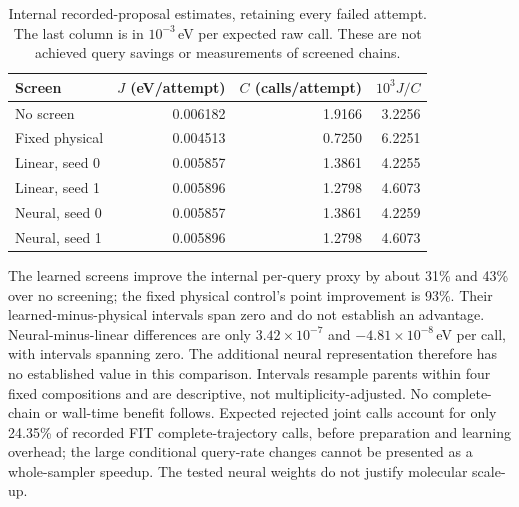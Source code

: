 \begin{table}[h]
\centering\small
\begin{tabular}{lrrr}
\toprule
Screen & $J$ (eV/attempt) & $C$ (calls/attempt) & $10^3 J/C$ \\
\midrule
No screen & 0.006182 & 1.9166 & 3.2256 \\
Fixed physical & 0.004513 & 0.7250 & 6.2251 \\
Linear, seed 0 & 0.005857 & 1.3861 & 4.2255 \\
Linear, seed 1 & 0.005896 & 1.2798 & 4.6073 \\
Neural, seed 0 & 0.005857 & 1.3861 & 4.2259 \\
Neural, seed 1 & 0.005896 & 1.2798 & 4.6073 \\
\bottomrule
\end{tabular}
\caption{Internal recorded-proposal estimates, retaining every failed attempt.
The last column is in $10^{-3}$\,eV per expected raw call. These are not achieved
query savings or measurements of screened chains.}
\label{tab:delayed-screen}
\end{table}

The learned screens improve the internal per-query proxy by about 31\% and
43\% over no screening; the fixed physical control's point improvement is 93\%.
Their learned-minus-physical intervals span zero and do not establish an
advantage. Neural-minus-linear differences are only $3.42\times10^{-7}$ and
$-4.81\times10^{-8}$\,eV per call, with intervals spanning zero. The additional
neural representation therefore has no established value in this comparison.
Intervals resample parents within four fixed compositions and are descriptive,
not multiplicity-adjusted. No complete-chain or wall-time benefit follows.
Expected rejected joint calls account for only 24.35\% of recorded FIT
complete-trajectory calls, before preparation and learning overhead; the large
conditional query-rate changes cannot be presented as a whole-sampler speedup.
The tested neural weights do not justify molecular scale-up.
